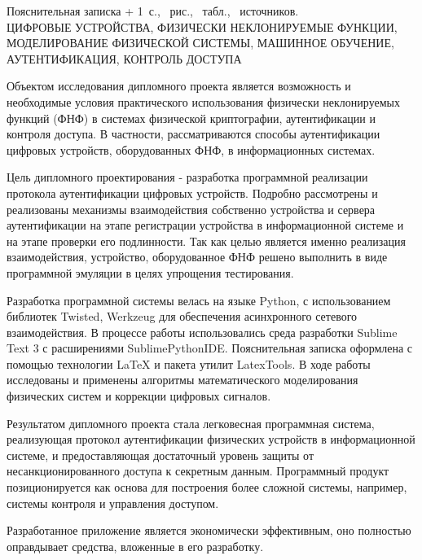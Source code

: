 
\newcommand{\totpages}{\number\numexpr{} + 1}

\begin{center}
    Пояснительная записка \totpages~с., \totfig{}~рис., \tottab{}~табл., \totref{}~источников.
    \\
    \MakeUppercase{цифровые устройства, физически неклонируемые функции, моделирование физической системы, машинное обучение, аутентификация, контроль доступа}
\end{center}

Объектом исследования дипломного проекта является возможность и необходимые условия практического использования физически неклонируемых функций (ФНФ) в системах физической криптографии, аутентификации и контроля доступа. В частности, рассматриваются способы аутентификации цифровых устройств, оборудованных ФНФ, в информационных системах.

Цель дипломного проектирования - разработка программной реализации протокола аутентификации цифровых устройств. Подробно рассмотрены и реализованы механизмы взаимодействия собственно устройства и сервера аутентификации на этапе регистрации устройства в информационной системе и на этапе проверки его подлинности.
Так как целью является именно реализация взаимодействия, устройство, оборудованное ФНФ решено выполнить в виде программной эмуляции в целях упрощения тестирования.

Разработка программной системы велась на языке Python, с использованием библиотек Twisted, Werkzeug для обеспечения асинхронного сетевого взаимодействия. В процессе работы использовались среда разработки Sublime Text 3 с расширениями SublimePythonIDE. Пояснительная записка оформлена с помощью технологии LaTeX и пакета утилит LatexTools. В ходе работы исследованы и применены алгоритмы математического моделирования физических систем и коррекции цифровых сигналов.

Результатом дипломного проекта стала легковесная программная система, реализующая протокол аутентификации физических устройств в информационной системе, и предоставляющая достаточный уровень защиты от несанкционированного доступа к секретным данным. Программный продукт позиционируется как основа для построения более сложной системы, например, системы контроля и управления доступом.

Разработанное приложение является экономически эффективным, оно полностью оправдывает средства, вложенные в его разработку.

\clearpage
